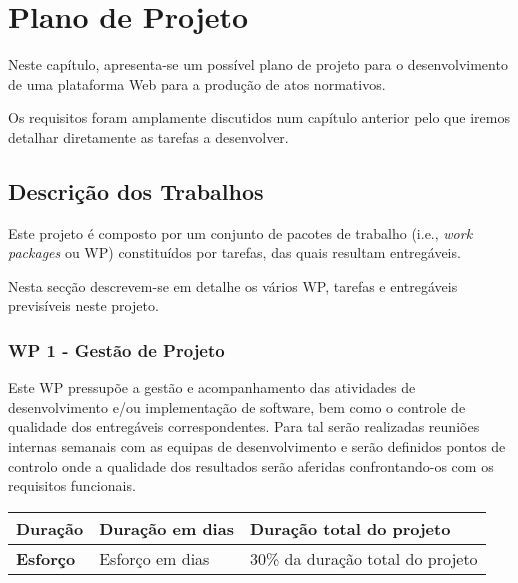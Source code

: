 \chapter{Plano de Projeto}

Neste capítulo, apresenta-se um possível plano de projeto para o desenvolvimento de uma plataforma Web para a 
produção de atos normativos.

Os requisitos foram amplamente discutidos num capítulo anterior pelo que iremos detalhar diretamente as tarefas 
a desenvolver.

\section{Descrição dos Trabalhos}

Este projeto é composto por um conjunto de pacotes de trabalho (i.e., \emph{work packages} ou WP) constituídos por tarefas, 
das quais resultam entregáveis. 

Nesta secção descrevem-se em detalhe os vários WP, tarefas e entregáveis previsíveis neste projeto.

\subsection{WP 1 - Gestão de Projeto}

Este WP pressupõe a gestão e acompanhamento das atividades de desenvolvimento e/ou implementação de software, 
bem como o controle de qualidade dos entregáveis correspondentes. 
Para tal serão realizadas reuniões internas semanais com as equipas de desenvolvimento e serão definidos pontos de controlo 
onde a qualidade dos resultados serão aferidas confrontando-os com os requisitos funcionais.

\begin{tabular}{|p{3cm}|p{5cm}|l|}
\hline
\textbf{Duração} & Duração em dias & Duração total do projeto \\
\hline
\textbf{Esforço} & Esforço em dias & 30\% da duração total do projeto\\
\hline
\end{tabular}

\vspace{0.5cm}

